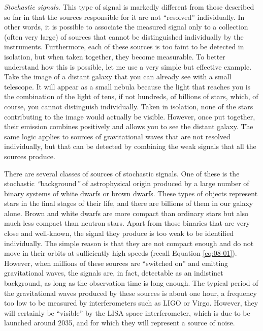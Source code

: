 \emph{Stochastic signals.} This type of signal is markedly different from those
described so far in that the sources responsible for it are not ``resolved''
individually. In other words, it is possible to associate the measured signal only to a
collection (often very large) of sources that cannot be distinguished individually by
the instruments. Furthermore, each of these sources is too faint to be detected in
isolation, but when taken together, they become measurable. To better understand how
this is possible, let me use a very simple but effective example. Take the image of a
distant galaxy that you can already see with a small telescope. It will appear as a
small nebula because the light that reaches you is the combination of the light of tens,
if not hundreds, of billions of stars, which, of course, you cannot distinguish
individually. Taken in isolation, none of the stars contributing to the image would
actually be visible. However, once put together, their emission combines positively and
allows you to see the distant galaxy. The same logic applies to sources of gravitational
waves that are not resolved individually, but that can be detected by combining the weak
signals that all the sources produce.

There are several classes of sources of stochastic signals. One of these is the
stochastic \emph{``}background\emph{''} of astrophysical origin
produced by a large number of binary systems of white dwarfs or brown
dwarfs. These types of objects represent stars in the final stages of
their life, and there are billions of them in our galaxy alone. Brown and white dwarfs
are more compact than ordinary stars but also much less compact than neutron stars.
Apart from those binaries that are very close and well-known, the signal they produce is
too weak to be identified individually. The simple reason is that they are not compact
enough and do not move in their orbits at sufficiently high speeds (recall Equation
\eqref{eq:08-01}). However, when millions of these sources are ``switched on'' and emitting
gravitational waves, the signals are, in fact, detectable as an indistinct background,
as long as the observation time is long enough. The typical period of the gravitational
waves produced by these sources is about one hour, a frequency too low to be measured by
interferometers such as LIGO or Virgo. However, they will certainly be ``visible'' by
the LISA space interferometer, which is due to be
launched around 2035, and for which they will represent a source of
noise.

